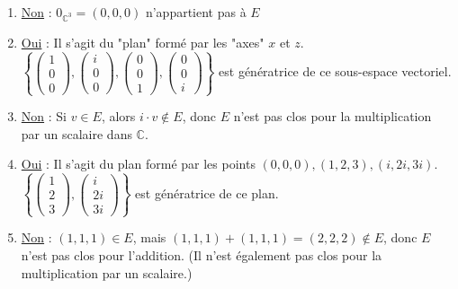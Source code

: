 \documentclass[a4paper, 10pt]{report}
\begin{document}
\begin{enumerate}[label=\arabic*.]
{\begin{minipage}{0.9\textwidth}
				\begin{enumerate}[label=(\alph*)]
					\item \underline{Non} : 
						$0_{\mathbb{C}^3} = (0, 0, 0)$
						n'appartient pas à $E$
					\item \underline{Oui} : Il s'agit du "plan" formé
						par les "axes" $x$ et $z$.\\
						$\left\{\left(\begin{smallmatrix}
							1\\ 0 \\ 0
						\end{smallmatrix}\right),
						\left(\begin{smallmatrix}
							i\\ 0 \\ 0
						\end{smallmatrix}\right),
						\left(\begin{smallmatrix}
							0\\ 0 \\ 1
						\end{smallmatrix}\right),
						\left(\begin{smallmatrix}
							0\\ 0 \\ i
						\end{smallmatrix}\right)\right\}$
						est génératrice de ce sous-espace vectoriel.
					\item \underline{Non} : Si $v \in E$, alors
						$i \cdot v \notin E$, donc $E$ n'est pas clos
						pour la multiplication par un scalaire dans
						$\mathbb{C}$.
					\item \underline{Oui} : Il s'agit du plan formé par
						les points $(0, 0, 0), (1, 2, 3), (i, 2i, 3i)$.\\
						$\left\{\left(\begin{smallmatrix}
							1\\ 2 \\ 3
						\end{smallmatrix}\right),
						\left(\begin{smallmatrix}
							i\\ 2i \\ 3i
						\end{smallmatrix}\right)\right\}$
						est génératrice de ce plan.
					\item \underline{Non} : $(1, 1, 1) \in E$, mais
						$(1, 1, 1) + (1, 1, 1) = (2, 2, 2) \notin E$,
						donc $E$ n'est pas clos pour l'addition.
						(Il n'est également pas clos pour la
						multiplication par un scalaire.)
				\end{enumerate}
			\end{minipage}
		}
	\end{enumerate}
\end{document}
